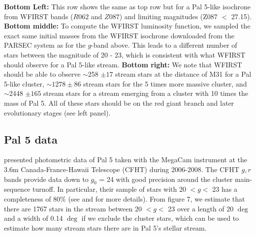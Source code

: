 \documentclass[twocolumn]{aastex62}
\begin{document}
\begin{figure*}
{%
{\bf Bottom Left:} This row shows the same as top row but for a Pal 5-like isochrone from WFIRST bands ($R062$ and $Z087$) and limiting magnitudes (Z087 $<$ 27.15). {\bf Bottom middle:} To compute the WFIRST luminosity function, we sampled the exact same initial masses from the WFIRST isochrone downloaded from the PARSEC system as for the $g$-band above. This leads to a different number of stars between the magnitude of 20 - 23, which is consistent with what WFIRST should observe for a Pal 5-like stream. {\bf Bottom right:} We note that WFIRST should be able to observe ${\sim}$258 $\pm 17$ stream stars at the distance of M31 for a Pal 5-like cluster, ${\sim}1278 \pm86$ stream stars for the 5 times more massive cluster, and ${\sim}$2448 $\pm165$ stream stars for a stream emerging from a cluster with 10 times the mass of Pal 5. All of these stars should be on the red giant branch and later evolutionary stages (see left panel).}
\label{fig:iso_cfht}
\end{figure*}



\subsection{Pal 5 data}
\label{sec:pal5}
 \citet{ibata16} presented photometric data of Pal 5 taken with the MegaCam instrument at the 3.6m Canada-France-Hawaii Telescope (CFHT) during 2006-2008. The CFHT $g, r$ bands provide data down to $g_0$ = 24 with good precision around the cluster main-sequence turnoff. In particular, their sample of stars with 20 $< g <$ 23 has a completeness of 80\% (see \citealt{ibata16} and \citealt{ibata17} for more details). From \citet{ibata16} figure 7, we estimate that there are 1767 stars in the stream between 20 $< g <$ 23 over a length of 20 $\deg$  and a width of 0.14 $\deg$ if we exclude the cluster stars, which can be used to estimate how many stream stars there are in Pal 5's stellar stream.
 
\end{document}
